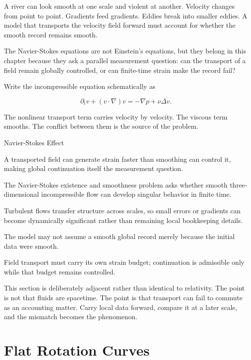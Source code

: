 A river can look smooth at one scale and violent at another. Velocity changes
from point to point. Gradients feed gradients. Eddies break into smaller
eddies. A model that transports the velocity field forward must account for
whether the smooth record remains smooth.

The Navier-Stokes equations are not Einstein's equations, but they belong in
this chapter because they ask a parallel measurement question: can the
transport of a field remain globally controlled, or can finite-time strain
make the record fail?

Write the incompressible equation schematically as

\[
\partial_t v + (v \cdot \nabla)v = -\nabla p + \nu \Delta v.
\label{eq:chapter9-navier-stokes}
\]

The nonlinear transport term carries velocity by velocity. The viscous term
smooths. The conflict between them is the source of the problem.

\begin{phenom}{Navier-Stokes Effect}
\label{ph:navier-stokes-effect}

\PhStatement A transported field can generate strain faster than smoothing can
control it, making global continuation itself the measurement question.

\PhOrigin The Navier-Stokes existence and smoothness problem asks whether
smooth three-dimensional incompressible flow can develop singular behavior in
finite time.

\PhObservation Turbulent flows transfer structure across scales, so small
errors or gradients can become dynamically significant rather than remaining
local bookkeeping details.

\PhConstraint The model may not assume a smooth global record merely because
the initial data were smooth.

\PhConsequence Field transport must carry its own strain budget; continuation
is admissible only while that budget remains controlled.

\end{phenom}

This section is deliberately adjacent rather than identical to relativity. The
point is not that fluids are spacetime. The point is that transport can fail to
commute as an accounting matter. Carry local data forward, compare it at a
later scale, and the mismatch becomes the phenomenon.

\section{Flat Rotation Curves}
\label{se:flat-rotation-curves}

